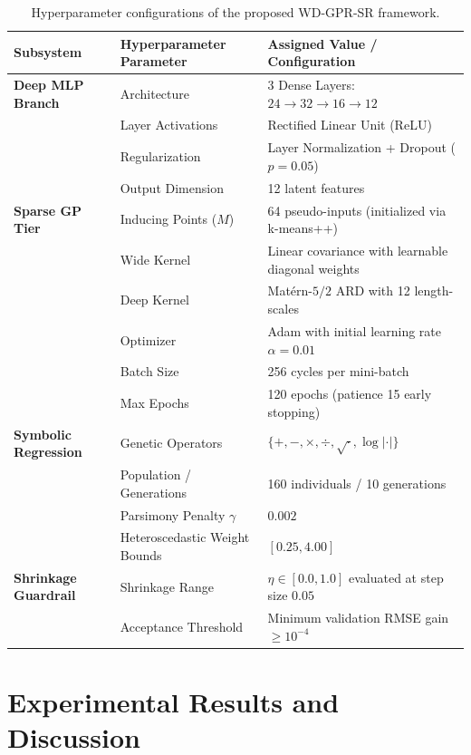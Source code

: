 \documentclass[a4paper,fleqn]{cas-sc}
\begin{document}
\begin{table}[pos=htbp]
\centering
\caption{Hyperparameter configurations of the proposed WD-GPR-SR framework.}
\label{tab:hyperparameters}
\small
\renewcommand{\arraystretch}{1.15}
\begin{tabular}{lll}
\toprule
\textbf{Subsystem} & \textbf{Hyperparameter Parameter} & \textbf{Assigned Value / Configuration} \\
\midrule
\textbf{Deep MLP Branch} & Architecture & 3 Dense Layers: $24 \to 32 \to 16 \to 12$ \\
 & Layer Activations & Rectified Linear Unit (ReLU) \\
 & Regularization & Layer Normalization + Dropout ($p=0.05$) \\
 & Output Dimension & 12 latent features \\
\midrule
\textbf{Sparse GP Tier} & Inducing Points ($M$) & 64 pseudo-inputs (initialized via k-means++) \\
 & Wide Kernel & Linear covariance with learnable diagonal weights \\
 & Deep Kernel & Matérn-$5/2$ ARD with 12 length-scales \\
 & Optimizer & Adam with initial learning rate $\alpha = 0.01$ \\
 & Batch Size & 256 cycles per mini-batch \\
 & Max Epochs & 120 epochs (patience 15 early stopping) \\
\midrule
\textbf{Symbolic Regression} & Genetic Operators & $\{+, -, \times, \div, \sqrt{\cdot}, \log|\cdot|\}$ \\
 & Population / Generations & 160 individuals / 10 generations \\
 & Parsimony Penalty $\gamma$ & $0.002$ \\
 & Heteroscedastic Weight Bounds & $[0.25, 4.00]$ \\
\midrule
\textbf{Shrinkage Guardrail} & Shrinkage Range & $\eta \in [0.0, 1.0]$ evaluated at step size $0.05$ \\
 & Acceptance Threshold & Minimum validation RMSE gain $\ge 10^{-4}$ \\
\bottomrule
\end{tabular}
\end{table}

\section{Experimental Results and Discussion}
\end{document}

